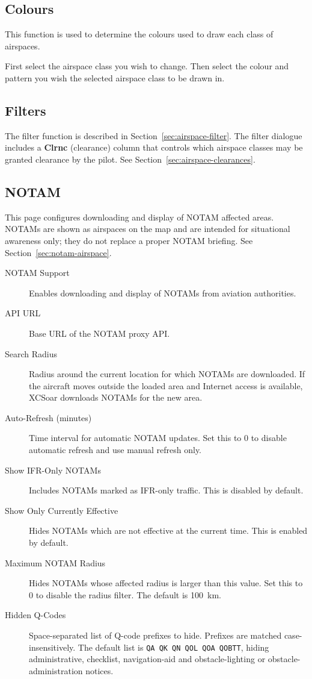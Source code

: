 \subsection*{Colours}
This function is used to determine the colours used to draw each class of
airspaces.

First select the airspace class you wish to change. Then select the colour and 
pattern you wish the selected airspace class to be drawn in.

\subsection*{Filters}
The filter function is described in Section~\ref{sec:airspace-filter}.
The filter dialogue includes a \textbf{Clrnc} (clearance) column that
controls which airspace classes may be granted clearance by the pilot.
See Section~\ref{sec:airspace-clearances}.

\subsection*{NOTAM}

This page configures downloading and display of NOTAM affected areas.
NOTAMs are shown as airspaces on the map and are intended for
situational awareness only; they do not replace a proper NOTAM briefing.
See Section~\ref{sec:notam-airspace}.

\begin{description}
\item[NOTAM Support]  Enables downloading and display of NOTAMs from
  aviation authorities.
\item[API URL]  Base URL of the NOTAM proxy API.
\item[Search Radius]  Radius around the current location for which NOTAMs
  are downloaded.  If the aircraft moves outside the loaded area and
  Internet access is available, XCSoar downloads NOTAMs for the new area.
\item[Auto-Refresh (minutes)]  Time interval for automatic NOTAM updates.
  Set this to 0 to disable automatic refresh and use manual refresh only.
\item[Show IFR-Only NOTAMs]  Includes NOTAMs marked as IFR-only traffic.
  This is disabled by default.
\item[Show Only Currently Effective]  Hides NOTAMs which are not effective
  at the current time.  This is enabled by default.
\item[Maximum NOTAM Radius]  Hides NOTAMs whose affected radius is larger
  than this value.  Set this to 0 to disable the radius filter.  The
  default is 100~km.
\item[Hidden Q-Codes]  Space-separated list of Q-code prefixes to hide.
  Prefixes are matched case-insensitively.  The default list is
  \texttt{QA QK QN QOL QOA QOBTT}, hiding administrative, checklist,
  navigation-aid and obstacle-lighting or obstacle-administration notices.
\end{description}


